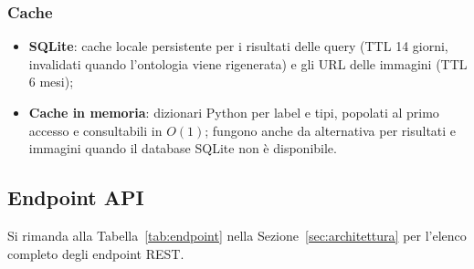 \subsubsection{Cache}

\begin{itemize}[nosep]
  \item \textbf{SQLite}: cache locale persistente per i risultati delle query (TTL 14 giorni, invalidati
    quando l'ontologia viene rigenerata) e gli URL delle immagini (TTL 6 mesi);
  \item \textbf{Cache in memoria}: dizionari Python per label e tipi, popolati al primo accesso e
    consultabili in $O(1)$; fungono anche da alternativa per risultati e immagini quando il database SQLite
    non \`e disponibile.
\end{itemize}

\subsection{Endpoint API}

Si rimanda alla Tabella~\ref{tab:endpoint} nella Sezione~\ref{sec:architettura} per l'elenco completo
degli endpoint REST.
